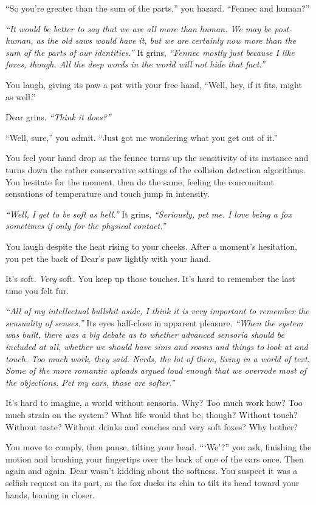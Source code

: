 ``So you're greater than the sum of the parts,'' you hazard. ``Fennec and human?''

\emph{``It would be better to say that we are all more than human. We may be post-human, as the old saws would have it, but we are certainly now more than the sum of the parts of our identities.''} It grins, \emph{``Fennec mostly just because I like foxes, though. All the deep words in the world will not hide that fact.''}

You laugh, giving its paw a pat with your free hand, ``Well, hey, if it fits, might as well.''

Dear grins. \emph{``Think it does?''}

``Well, sure,'' you admit. ``Just got me wondering what you get out of it.''

You feel your hand drop as the fennec turns up the sensitivity of its instance and turns down the rather conservative settings of the collision detection algorithms. You hesitate for the moment, then do the same, feeling the concomitant sensations of temperature and touch jump in intensity.

\emph{``Well, I get to be soft as hell.''} It grins, \emph{``Seriously, pet me. I love being a fox sometimes if only for the physical contact.''}

You laugh despite the heat rising to your cheeks. After a moment's hesitation, you pet the back of Dear's paw lightly with your hand.

It's soft. \emph{Very} soft. You keep up those touches. It's hard to remember the last time you felt fur.

\emph{``All of my intellectual bullshit aside, I think it is very important to remember the sensuality of senses.''} Its eyes half-close in apparent pleasure. \emph{``When the system was built, there was a big debate as to whether advanced sensoria should be included at all, whether we should have sims and rooms and things to look at and touch. Too much work, they said. Nerds, the lot of them, living in a world of text. Some of the more romantic uploads argued loud enough that we overrode most of the objections. Pet my ears, those are softer.''}

It's hard to imagine, a world without sensoria. Why? Too much work how? Too much strain on the system? What life would that be, though? Without touch? Without taste? Without drinks and couches and very soft foxes? Why bother?

You move to comply, then pause, tilting your head. ```We'?'' you ask, finishing the motion and brushing your fingertips over the back of one of the ears once. Then again and again. Dear wasn't kidding about the softness. You suspect it was a selfish request on its part, as the fox ducks its chin to tilt its head toward your hands, leaning in closer.

